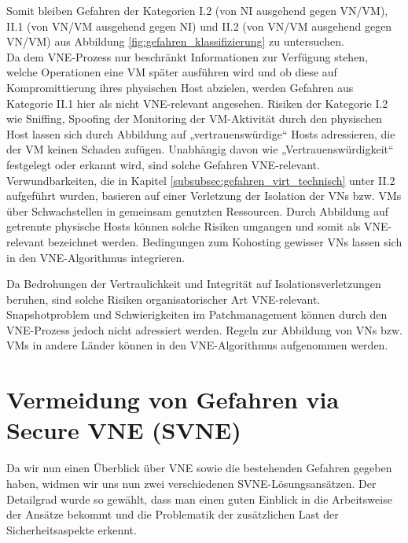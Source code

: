 \documentclass{lni}
\begin{document}
Somit bleiben Gefahren der Kategorien I.2 (von NI ausgehend gegen VN/VM), II.1 (von VN/VM ausgehend gegen NI) und II.2 (von VN/VM ausgehend gegen VN/VM) aus Abbildung \ref{fig:gefahren_klassifizierung} zu untersuchen.\\
Da dem VNE-Prozess nur beschränkt Informationen zur Verfügung stehen, welche Operationen eine VM später ausführen wird und ob diese auf Kompromittierung ihres physischen Host abzielen, werden Gefahren aus Kategorie II.1 hier als nicht VNE-relevant angesehen. 
Risiken der Kategorie I.2 wie Sniffing, Spoofing der Monitoring der VM-Aktivität durch den physischen Host lassen sich durch Abbildung auf „vertrauenswürdige“ Hosts adressieren, die der VM keinen Schaden zufügen. Unabhängig davon wie „Vertrauenswürdigkeit“ festgelegt oder erkannt wird, sind solche Gefahren VNE-relevant.\\
Verwundbarkeiten, die in Kapitel \ref{subsubsec:gefahren_virt_technisch} unter II.2 aufgeführt wurden, basieren auf einer Verletzung der Isolation der VNs bzw. VMs über Schwachstellen in gemeinsam genutzten Ressourcen. Durch Abbildung auf getrennte physische Hosts können solche Risiken umgangen und somit als VNE-relevant bezeichnet werden. Bedingungen zum Kohosting gewisser VNs lassen sich in den VNE-Algorithmus integrieren. 

Da Bedrohungen der Vertraulichkeit und Integrität auf Isolationsverletzungen beruhen, sind solche Risiken organisatorischer Art VNE-relevant. Snapshotproblem und Schwierigkeiten im Patchmanagement können durch den VNE-Prozess jedoch nicht adressiert werden.
Regeln zur Abbildung von VNs bzw. VMs in andere Länder können in den VNE-Algorithmus aufgenommen werden.

%
%
%


\section{Vermeidung von Gefahren via Secure VNE (SVNE)}
\label{sec:svne}
Da wir nun einen Überblick über VNE sowie die bestehenden Gefahren gegeben haben, widmen wir uns nun zwei verschiedenen SVNE-Lösungsansätzen. Der Detailgrad wurde so gewählt, dass man einen guten Einblick in die Arbeitsweise der Ansätze bekommt und die Problematik der zusätzlichen Last der Sicherheitsaspekte erkennt.
\end{document}
